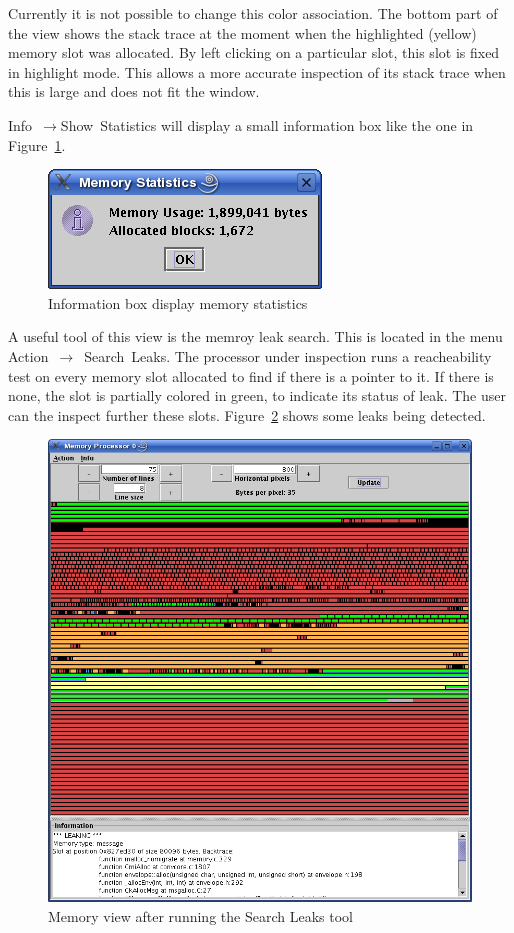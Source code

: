 Currently it is not possible to change this color association. The bottom part
of the view shows the stack trace at the moment when the highlighted (yellow)
memory slot was allocated. By left clicking on a particular slot, this slot is
fixed in highlight mode. This allows a more accurate inspection of its stack
trace when this is large and does not fit the window.

Info~$\rightarrow$Show~Statistics will display a small information box like the
one in Figure~\ref{fig:memory-stat}.

\begin{figure}[ht!]
\centering
\includegraphics[scale=0.5]{figs/memoryStatistics}
\caption{Information box display memory statistics}
\label{fig:memory-stat}
\end{figure}

A useful tool of this view is the memroy leak search. This is located in the
menu Action~$\rightarrow$~Search~Leaks. The processor under inspection runs a
reacheability test on every memory slot allocated to find if there is a pointer
to it. If there is none, the slot is partially colored in green, to indicate its
status of leak. The user can the inspect further these slots. 
Figure~\ref{fig:memory-leak} shows some leaks being detected.

\begin{figure}[ht!]
\centering
\includegraphics[scale=0.5]{figs/memoryLeaking}
\caption{Memory view after running the Search Leaks tool}
\label{fig:memory-leak}
\end{figure}

